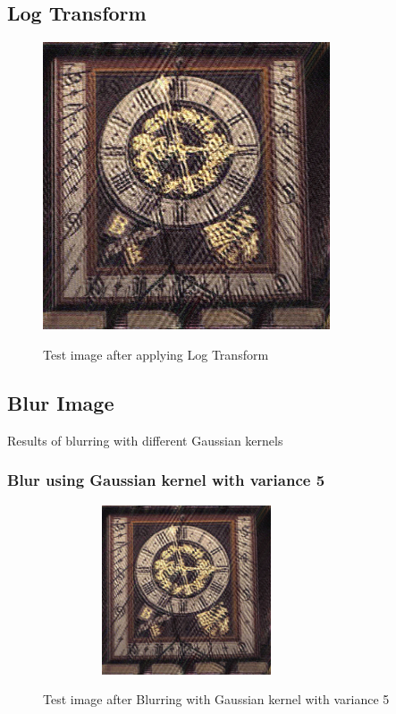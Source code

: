 \documentclass{article}
\begin{document}
\subsection[h]{Log Transform}
\begin{figure}[!h]

\begin{minipage}[b]{1.0\linewidth}
  \centering
  \centerline{\includegraphics[width=8.5cm]{temp.jpg}}
  \centerline{Test image after applying Log Transform}\medskip
\end{minipage}
%
\end{figure}


\subsection[h]{Blur Image}Results of blurring with different Gaussian kernels 
\subsubsection[h]{Blur using Gaussian kernel with variance 5 }
\begin{figure}[htb]

\begin{minipage}[b]{1.0\linewidth}
  \centering
  \centerline{\includegraphics[width=8.5cm,height = 5cm ,keepaspectratio]{temp.jpg}}
  \centerline{Test image after Blurring with Gaussian kernel with variance 5}\medskip
\end{minipage}
%
\end{figure}
\end{document}
